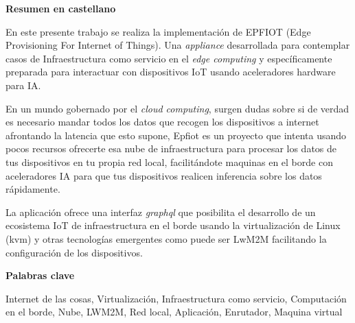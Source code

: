 
\newpage

\thispagestyle{empty}

\begin{center}

{\bf \Huge Resumen en castellano}

  \end{center}
\vspace{1cm}

En este presente trabajo se realiza la implementación de EPFIOT (Edge Provisioning For Internet of Things). Una \textit{appliance} desarrollada para contemplar casos de Infraestructura como servicio en el \textit{edge computing} y específicamente preparada para interactuar con dispositivos IoT usando aceleradores hardware para IA.

En un mundo gobernado por el \textit{cloud computing}, surgen dudas sobre si de verdad es necesario mandar todos los datos que recogen los dispositivos a internet afrontando la latencia que esto supone, Epfiot es un proyecto que intenta usando pocos recursos ofrecerte esa nube de infraestructura para procesar los datos de tus dispositivos en tu propia red local, facilitándote maquinas en el borde con aceleradores IA para que tus dispositivos realicen inferencia sobre los datos rápidamente.

La aplicación ofrece una interfaz \textit{graphql} que posibilita el desarrollo de un ecosistema IoT de infraestructura en el borde usando la virtualización de Linux (kvm) y otras tecnologías emergentes como puede ser LwM2M facilitando la configuración de los dispositivos.

\vspace{1cm}


\begin{center}

{\bf \Large Palabras clave}

   \end{center}

   \vspace{0.5cm}
   
   Internet de las cosas, Virtualización, Infraestructura como servicio, Computación en el borde, Nube, LWM2M, Red local, Aplicación, Enrutador, Maquina virtual
   



